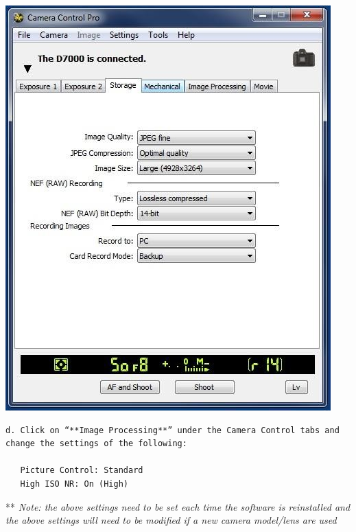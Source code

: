 \documentclass[
]{book}
\begin{document}
\includegraphics{images/Camera5.jpg}

\begin{verbatim}
d. Click on “**Image Processing**” under the Camera Control tabs and change the settings of the following:  

   Picture Control: Standard  
   High ISO NR: On (High)
\end{verbatim}

** \emph{Note: the above settings need to be set each time the software is reinstalled and the above settings will need to be modified if a new camera model/lens are used}
\end{document}
